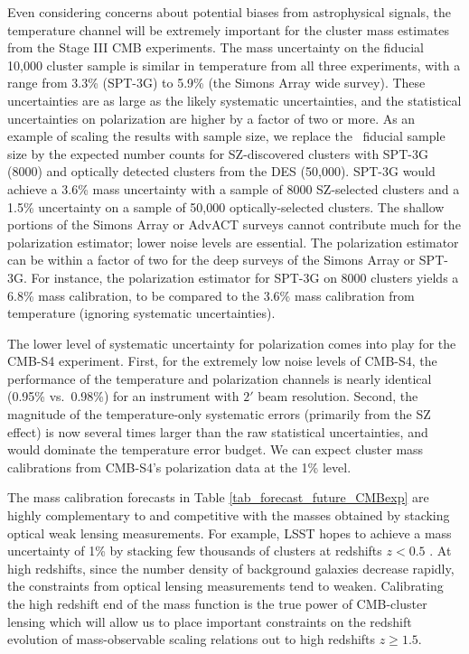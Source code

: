Even considering concerns about potential biases from astrophysical signals, the temperature channel will be extremely important for the cluster mass estimates from the Stage III CMB experiments. %
 The mass uncertainty on the fiducial 10,000 cluster sample  is similar in temperature from all three experiments, with a range from 3.3\% (SPT-3G) to 5.9\% (the Simons Array wide survey). These uncertainties are as large as the likely systematic uncertainties, and the statistical uncertainties on polarization are higher by a factor of two or more. As an example of scaling the results with sample size, we replace the \
fiducial sample size by the expected number counts for SZ-discovered clusters with SPT-3G (8000) and optically detected clusters from the DES (50,000). SPT-3G would achieve a 3.6\% mass uncertainty with a sample of 8000 SZ-selected clusters and a 1.5\% uncertainty on a sample of 50,000 optically-selected clusters. The shallow portions of the Simons Array or AdvACT surveys cannot contribute much for the polarization estimator; lower noise levels are essential. The polarization estimator can be within a factor of two for the deep surveys of the Simons Array or SPT-3G. For instance, the polarization estimator for SPT-3G on 8000 clusters yields a 6.8\% mass calibration, to be compared to the 3.6\% mass calibration from temperature (ignoring systematic uncertainties).


The lower level of systematic uncertainty for polarization comes into play for the CMB-S4 experiment. First, for the extremely low noise levels of CMB-S4, the performance of the temperature and polarization channels is nearly identical (0.95\% vs.~0.98\%) for an instrument with $2'$ beam resolution. Second, the magnitude of the temperature-only systematic errors (primarily from the SZ effect) is now several times larger than the raw statistical uncertainties, and would dominate the temperature error budget. We can expect cluster mass calibrations from CMB-S4's polarization data at the 1\% level.

The mass calibration forecasts in  Table \ref{tab_forecast_future_CMBexp} are highly complementary  to and competitive with the masses obtained by stacking optical weak lensing measurements. For example, LSST hopes to achieve a mass uncertainty of 1\% by stacking few thousands of clusters at redshifts $z < 0.5$ \citep{lsst09}. At high redshifts, since the number density of background galaxies decrease rapidly, the constraints from optical lensing measurements tend to weaken. Calibrating the high redshift end of the mass function is the true power of CMB-cluster lensing which will allow us to place important constraints on the redshift evolution of mass-observable scaling relations out to high redshifts $z \ge 1.5$.

